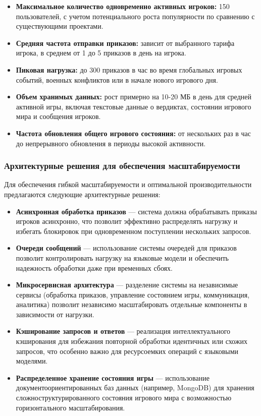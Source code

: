 \begin{itemize}
    \item \textbf{Максимальное количество одновременно активных игроков:} 150 пользователей, с учетом потенциального роста популярности по сравнению с существующими проектами.

    \item \textbf{Средняя частота отправки приказов:} зависит от выбранного тарифа игрока, в среднем от 1 до 5 приказов в день на игрока.

    \item \textbf{Пиковая нагрузка:} до 300 приказов в час во время глобальных игровых событий, военных конфликтов или в начале нового игрового дня.

    \item \textbf{Объем хранимых данных:} рост примерно на 10-20 МБ в день для средней активной игры, включая текстовые данные о вердиктах, состоянии игрового мира и сообщения игроков.

    \item \textbf{Частота обновления общего игрового состояния:} от нескольких раз в час до непрерывного обновления в периоды высокой активности.
\end{itemize}

\subsubsection{Архитектурные решения для обеспечения масштабируемости}

Для обеспечения гибкой масштабируемости и оптимальной производительности предлагаются следующие архитектурные решения:

\begin{itemize}
    \item \textbf{Асинхронная обработка приказов} — система должна обрабатывать приказы игроков асинхронно, что позволит эффективно распределять нагрузку и избегать блокировок при одновременном поступлении нескольких запросов.

    \item \textbf{Очереди сообщений} — использование системы очередей для приказов позволит контролировать нагрузку на языковые модели и обеспечить надежность обработки даже при временных сбоях.

    \item \textbf{Микросервисная архитектура} — разделение системы на независимые сервисы (обработка приказов, управление состоянием игры, коммуникация, аналитика) позволит независимо масштабировать отдельные компоненты в зависимости от нагрузки.

    \item \textbf{Кэширование запросов и ответов} — реализация интеллектуального кэширования для избежания повторной обработки идентичных или схожих запросов, что особенно важно для ресурсоемких операций с языковыми моделями.

    \item \textbf{Распределенное хранение состояния игры} — использование документоориентированных баз данных (например, MongoDB) для хранения сложноструктурированного состояния игрового мира с возможностью горизонтального масштабирования.
\end{itemize}

